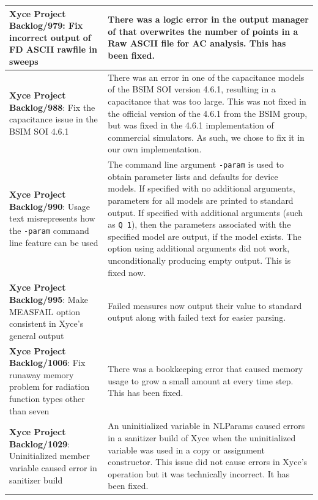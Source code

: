 {\begin{longtable}[h] {>{\raggedright\small}m{2in}|>{\raggedright\let\\\tabularnewline\small}m{3.5in}}
  \textbf{Xyce Project Backlog/979}: Fix incorrect output of FD ASCII rawfile in sweeps & There was a logic error in the output manager of \Xyce{} that overwrites the number of points in a Raw ASCII file for AC analysis.  This has been fixed.
  \\\hline

  \textbf{Xyce Project Backlog/988}: Fix the capacitance issue in the BSIM SOI 4.6.1 &  There was an error in one of the capacitance models of the BSIM SOI version 4.6.1, resulting in a capacitance that was too large.  This was not fixed in the official version of the 4.6.1 from the BSIM group, but was fixed in the 4.6.1 implementation of commercial simulators.  As such, we chose to fix it in our own implementation. 
  \\\hline

  \textbf{Xyce Project Backlog/990}:  Usage text misrepresents how the \texttt{-param} command line feature can be used &  
  The command line argument \texttt{-param} is used to obtain parameter lists and defaults for device models.  
  If specified with no additional arguments, parameters for all models are printed to standard output.  
  If specified with additional arguments (such as \texttt{Q 1}), then the parameters associated with the specified model are output, if the model exists.  
  The option using additional arguments did not work, unconditionally producing empty output. This is fixed now.
  \\\hline

  \textbf{Xyce Project Backlog/995}: Make MEASFAIL option consistent in Xyce's general output &  Failed measures now output their value to standard output along with failed text for easier parsing.
  \\\hline

  \textbf{Xyce Project Backlog/1006}: 
  Fix runaway memory problem for radiation function types other than seven &  There was a bookkeeping error that caused memory usage to grow a small amount at every time step.  This has been fixed.
  \\\hline

  \textbf{Xyce Project Backlog/1029}: Uninitialized member variable caused error in sanitizer build
    &  An uninitialized variable in NLParams caused errors in a sanitizer build of Xyce when the uninitialized
    variable was used in a copy or assignment constructor.  This issue did not cause errors in Xyce's operation 
    but it was technically incorrect.  It has been fixed. 
  \\\hline
 

\end{longtable}}
